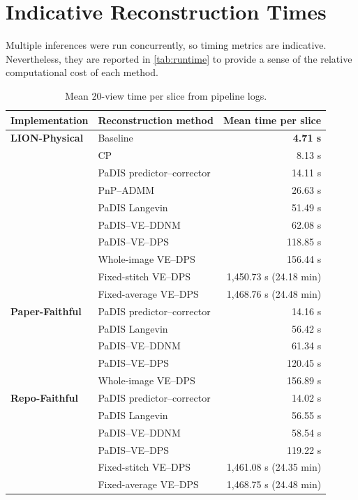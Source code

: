 \chapter{Indicative Reconstruction Times}
\label{app:runtime}

Multiple inferences were run concurrently, so timing metrics are indicative. Nevertheless, they are reported in \autoref{tab:runtime} to provide a sense of the relative computational cost of each method.

\begin{table}[htbp]
\centering
\caption[Logged reconstruction time per slice.]{Mean 20-view time per slice from pipeline logs.}\label{tab:runtime}
\small
\begin{tabular}{llr}
\toprule[1.1pt]
\multicolumn{1}{l}{\bfseries Implementation} & \multicolumn{1}{l}{\bfseries Reconstruction method} & \multicolumn{1}{r}{\bfseries Mean time per slice} \\
\midrule
\textbf{LION-Physical} & Baseline & \textbf{4.71 s} \\
 & CP & 8.13 s \\
 & PaDIS predictor--corrector & 14.11 s \\
 & PnP--ADMM & 26.63 s \\
 & PaDIS Langevin & 51.49 s \\
 & PaDIS--VE--DDNM & 62.08 s \\
 & PaDIS--VE--DPS & 118.85 s \\
 & Whole-image VE--DPS & 156.44 s \\
 & Fixed-stitch VE--DPS & 1,450.73 s (24.18 min) \\
 & Fixed-average VE--DPS & 1,468.76 s (24.48 min) \\
\midrule
\textbf{Paper-Faithful} & PaDIS predictor--corrector & 14.16 s \\
 & PaDIS Langevin & 56.42 s \\
 & PaDIS--VE--DDNM & 61.34 s \\
 & PaDIS--VE--DPS & 120.45 s \\
 & Whole-image VE--DPS & 156.89 s \\
\midrule
\textbf{Repo-Faithful} & PaDIS predictor--corrector & 14.02 s \\
 & PaDIS Langevin & 56.55 s \\
 & PaDIS--VE--DDNM & 58.54 s \\
 & PaDIS--VE--DPS & 119.22 s \\
 & Fixed-stitch VE--DPS & 1,461.08 s (24.35 min) \\
 & Fixed-average VE--DPS & 1,468.75 s (24.48 min) \\
\bottomrule[1.1pt]
\end{tabular}
\end{table}
